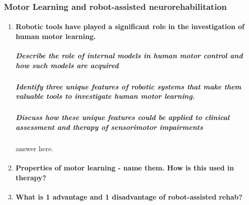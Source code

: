 \documentclass[12pt,article,oneside,a4paper]{memoir}
\begin{document}
\subsubsection{Motor Learning and robot-assisted neurorehabilitation}
\begin{enumerate}
\item \paragraph{Robotic tools have played a significant role in the investigation of human motor learning.}
\subparagraph{Describe the role of internal models in human motor control and how such models are acquired}
\subparagraph{Identify three unique features of robotic systems that make them valuable tools to investigate human motor learning.}
\subparagraph{Discuss how these unique features could be applied to clinical assessment and therapy of sensorimotor impairments} answer here.

\item \paragraph{Properties of motor learning - name them.  How is this used in therapy?}
\item \paragraph{What is 1 advantage and 1 disadvantage of robot-assisted rehab?}
\end{enumerate}
\end{document}
